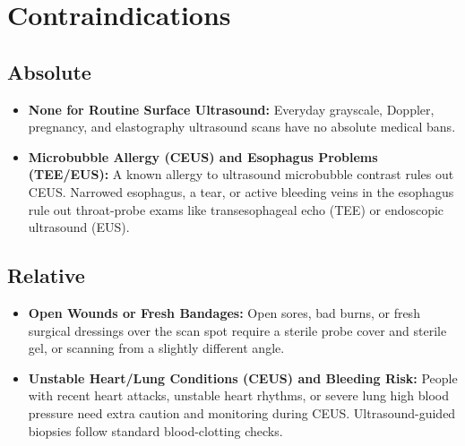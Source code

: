 \section{Contraindications}

\subsection{Absolute}
\begin{itemize}
  \item \textbf{None for Routine Surface Ultrasound:} Everyday grayscale, Doppler, pregnancy, and elastography ultrasound scans have no absolute medical bans.
  \item \textbf{Microbubble Allergy (CEUS) and Esophagus Problems (TEE/EUS):} A known allergy to ultrasound microbubble contrast rules out CEUS. Narrowed esophagus, a tear, or active bleeding veins in the esophagus rule out throat-probe exams like transesophageal echo (TEE) or endoscopic ultrasound (EUS).
\end{itemize}

\subsection{Relative}
\begin{itemize}
  \item \textbf{Open Wounds or Fresh Bandages:} Open sores, bad burns, or fresh surgical dressings over the scan spot require a sterile probe cover and sterile gel, or scanning from a slightly different angle.
  \item \textbf{Unstable Heart/Lung Conditions (CEUS) and Bleeding Risk:} People with recent heart attacks, unstable heart rhythms, or severe lung high blood pressure need extra caution and monitoring during CEUS. Ultrasound-guided biopsies follow standard blood-clotting checks.
\end{itemize}

